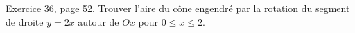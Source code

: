 \begin{exercice}\label{exoInter0015}

Exercice 36, page 52. Trouver l'aire du cône engendré par la rotation du segment de droite $y=2x$ autour de $Ox$ pour $0\leq x\leq 2$.

\end{exercice}
